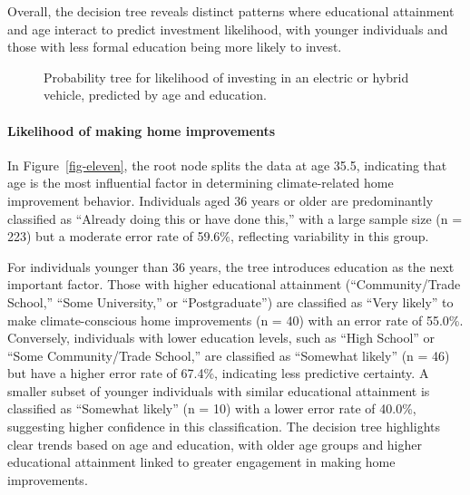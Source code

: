 \documentclass[
  letterpaper,
  DIV=11,
  numbers=noendperiod]{scrartcl}
\let\oldparagraph\paragraph
\renewcommand{\paragraph}[1]{\oldparagraph{#1}\mbox{}}
\begin{document}
Overall, the decision tree reveals distinct patterns where educational
attainment and age interact to predict investment likelihood, with
younger individuals and those with less formal education being more
likely to invest.

\begin{figure}


\caption{\label{fig-ten}Probability tree for likelihood of investing in
an electric or hybrid vehicle, predicted by age and education.}

\end{figure}%

\paragraph{Likelihood of making home
improvements}\label{likelihood-of-making-home-improvements}

In Figure~\ref{fig-eleven}, the root node splits the data at age 35.5,
indicating that age is the most influential factor in determining
climate-related home improvement behavior. Individuals aged 36 years or
older are predominantly classified as ``Already doing this or have done
this,'' with a large sample size (n = 223) but a moderate error rate of
59.6\%, reflecting variability in this group.

For individuals younger than 36 years, the tree introduces education as
the next important factor. Those with higher educational attainment
(``Community/Trade School,'' ``Some University,'' or ``Postgraduate'')
are classified as ``Very likely'' to make climate-conscious home
improvements (n = 40) with an error rate of 55.0\%. Conversely,
individuals with lower education levels, such as ``High School'' or
``Some Community/Trade School,'' are classified as ``Somewhat likely''
(n = 46) but have a higher error rate of 67.4\%, indicating less
predictive certainty. A smaller subset of younger individuals with
similar educational attainment is classified as ``Somewhat likely'' (n =
10) with a lower error rate of 40.0\%, suggesting higher confidence in
this classification. The decision tree highlights clear trends based on
age and education, with older age groups and higher educational
attainment linked to greater engagement in making home improvements.
\end{document}
